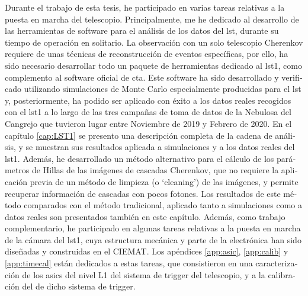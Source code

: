 \documentclass[main.tex]{subfiles}
\begin{document}
\begin{otherlanguage}{spanish}
Durante el trabajo de esta tesis, he participado en varias tareas relativas a la puesta en marcha del telescopio. Principalmente, me he dedicado al desarrollo de las herramientas de software para el análisis de los datos del \gls{lst}, durante su tiempo de operación en solitario. La observación con un solo telescopio Cherenkov requiere de unas técnicas de reconstrucción de eventos específicas, por ello, ha sido necesario desarrollar todo un paquete de herramientas dedicado al \gls{lst}1, como complemento al software oficial de \gls{cta}. Este software ha sido desarrollado y verificado utilizando simulaciones de Monte Carlo especialmente producidas para el \gls{lst} y, posteriormente, ha podido ser aplicado con éxito a los datos reales recogidos con el \gls{lst}1 a lo largo de las tres campañas de toma de datos de la Nebulosa del Cangrejo que tuvieron lugar entre Noviembre de 2019 y Febrero de 2020. En el capítulo \ref{cap:LST1} se presento una descripción completa de la cadena de análisis, y se muestran sus resultados aplicada a simulaciones y a los datos reales del \gls{lst}1. Además, he desarrollado un método alternativo para el cálculo de los parámetros de Hillas de las imágenes de cascadas Cherenkov, que no requiere la aplicación previa de un método de limpieza (o `cleaning') de las imágenes, y permite recuperar información de cascadas con pocos fotones. Los resultados de este método comparados con el método tradicional, aplicado tanto a simulaciones como a datos reales son presentados también en este capítulo. Además, como trabajo complementario, he participado en algunas tareas relativas a la puesta en marcha de la cámara del \gls{lst}1, cuya estructura mecánica y parte de la electrónica han sido diseñadas y construidas en el CIEMAT. Los apéndices \ref{app:asic}, \ref{app:calib} y \ref{app:timecal} están dedicados a estas tareas, que consistieron en una caracterización de los \glspl{asic} del nivel L1 del sistema de trigger del telescopio, y a la calibración del de dicho sistema de trigger.\\


\end{otherlanguage}
\end{document}
